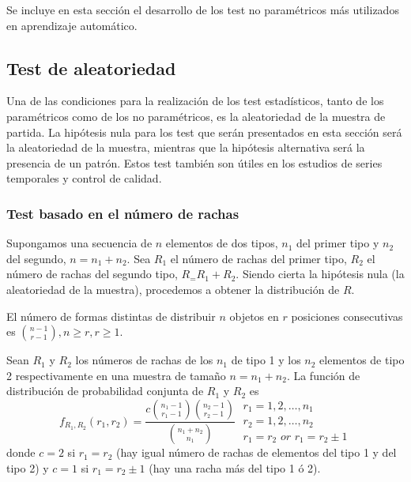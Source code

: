  
 	Se incluye en esta sección el desarrollo de los test no paramétricos más utilizados en aprendizaje automático.
 	
 	
\subsection{Test de aleatoriedad}

	Una de las condiciones para la realización de los test estadísticos, tanto de los paramétricos como de los no paramétricos, es la aleatoriedad de la muestra de partida. La hipótesis nula para los test que serán presentados en esta sección será la aleatoriedad de la muestra, mientras que la hipótesis alternativa será la presencia de un patrón. Estos test también son útiles en los estudios de series temporales y control de calidad.
	
\subsubsection{Test basado en el número de rachas}

	Supongamos una secuencia de $n$ elementos de dos tipos, $n_1$ del primer tipo y $n_2$ del segundo, $n = n_1 + n_2$. Sea $R_1$ el número de rachas del primer tipo, $R_2$ el número de rachas del segundo tipo, $R_ = R_1 + R_2$. Siendo cierta la hipótesis nula (la aleatoriedad de la muestra), procedemos a obtener la distribución de $R$.
	
\begin{lema} 
	El número de formas distintas de distribuir $n$ objetos en $r$ posiciones consecutivas es ${n-1 \choose r-1}, n \geq r, r \geq 1$.
\end{lema}

\begin{teorema}
	Sean $R_1$ y $R_2$ los números de rachas de los $n_1$ de tipo 1 y los $n_2$ elementos de tipo 2 respectivamente en una muestra de tamaño $n = n_1 + n_2$. La función de distribución de probabilidad conjunta de $R_1$ y $R_2$ es
	\[ f_{R_1,R_2} (r_1, r_2) = 
		\frac{c {n_1 - 1 \choose r_1 - 1} 
				{n_2 - 1 \choose r_2 - 1}}
			{{n_1 + n_2 \choose n_1}}\;
		\begin{array}{l}
			r_1 = 1,2, \dots, n_1 \\
			r_2 = 1,2, \dots, n_2 \\
			r_1 = r_2 \textit{ or } r_1 = r_2 \pm 1
		\end{array}
	\]
	donde $c=2$ si $r_1 = r_2$ (hay igual número de rachas de elementos del tipo 1 y del tipo 2) y $c=1$ si $r_1 = r_2 \pm 1$ (hay una racha más del tipo 1 ó 2).
\end{teorema}

